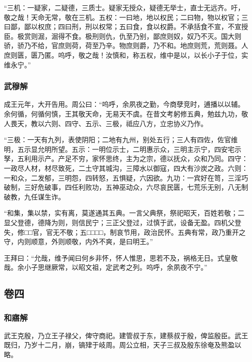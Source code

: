 \documentclass[]{article}
\begin{document}
``三机：一疑家，二疑德，三质士。疑家无授众，疑德无举士，直士无远齐。吁，敬之哉！天命无常，敬在三机。五权：一曰地，地以权民；二曰物，物以权官；三曰鄙，鄙以权庶；四曰刑，刑以权常；五曰食，食以权爵。不承括食不宣，不宣授臣。极赏则淈，淈得不食。极刑则仇，仇至乃别，鄙庶则奴，奴乃不灭。国大则骄，骄乃不给，官庶则荷，荷至乃辛。物庶则爵，乃不和。地庶则荒，荒则聂。人庶则匮，匮乃匿。呜呼，敬之哉！汝慎和，称五权，维中是以，以长小子于位，实维永宁。''

\hypertarget{header-n179}{%
\subsubsection{武穆解}\label{header-n179}}

成王元年，大开告用。周公曰：``呜呼，余夙夜之勤，今商孽竞时，逋播以以辅。余何循，何循何慎，王其敬天命，无易天不虞。在昔文考躬修五典，勉兹九功，敬人畏天，教以六则、四守、五示、三极，祗应八方，立忠协义乃作。

``三极：一天有九列，表使阴阳；二地有九州，别处五行；三人有四佐，佐官维明，五示显允明所望。五示：一明位示士，二明惠示众，三明主示宁，四安宅示孥，五利用示产。产足不穷，家怀思终，主为之宗，德以抚众，众和乃同。四守：一政尽人材，材尽致死，二土守其城沟，三障水以御寇，四大有沙炭之政。六则：一和众，二发郁，三明怨，四转怒，五惧疑，六因欲。九功：一宾好在笥，三淫巧破制，三好危破事，四任利败功，五神巫动众，六尽哀民匮，七荒乐无别，八无制破教，九任谋生诈。

``和集，集以禁，实有离，莫遂通其五典。一言父典祭，祭祀昭天，百姓若敬；二显父登德，德降为则，则信民宁；三正父登过，过慎于武，设备无盈。四机父登失，修□□官，官无不敬；五□□□□，制哀节用，政治民怀。五典有常，政乃重开之守，内则顺意，外则顺敬，内外不爽，是曰明王。''

王拜曰：``允哉，维予闻曰何乡非怀，怀人惟思，思若不及，祸格无日。式皇敬哉。余小子思继厥常，以昭文祖，定武考之列。呜呼，余夙夜不宁。''

\hypertarget{header-n187}{%
\subsection{卷四}\label{header-n187}}

\hypertarget{header-n191}{%
\subsubsection{和寤解}\label{header-n191}}

武王克殷，乃立王子禄父，俾守商祀。建管叔于东，建蔡叔于殷，俾监殷臣。武王既归，乃岁十二月，崩，镐肂于岐周。周公立相，天子三叔及殷东徐奄及熊盈以略。
\end{document}
